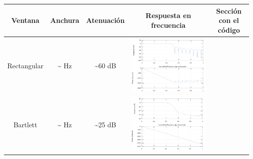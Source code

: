 \documentclass[11pt,a4paper]{article}
\begin{document}
\begin{table}[H]
\begin{tabular}{|c|c|c|c|c|}
\hline
Ventana  & Anchura & Atenuación & Respuesta en frecuencia & Sección con el código \\ \hline
Rectangular & \textasciitilde{} Hz            & \textasciitilde{}60 dB                       & \includegraphics[scale=0.25]{img/6.png} &  \color{deepred}\nameref{code5}\color{black} \\ \hline
Bartlett & \textasciitilde{} Hz            & \textasciitilde{}25 dB                       & \includegraphics[scale=0.25]{img/7.png} & \color{deepred}\nameref{code6}\color{black} \\ \hline

\end{tabular}
\end{table}
\end{document}
